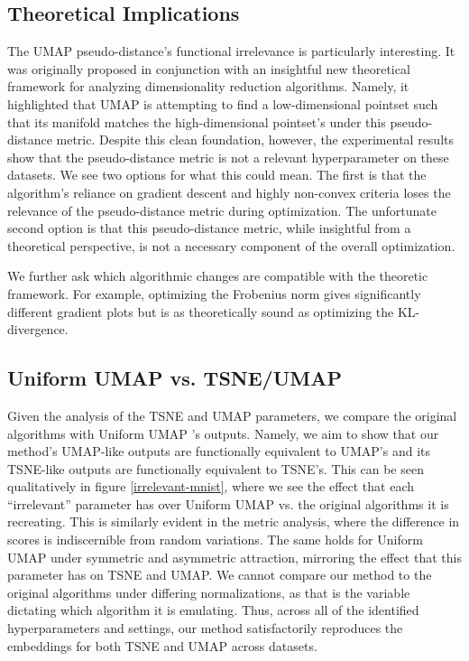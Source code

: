 \documentclass[sigconf, nonacm]{acmart}
\newcommand\ourmethod{Uniform UMAP }
\begin{document}
\subsection{Theoretical Implications}
The UMAP pseudo-distance's functional irrelevance is particularly interesting. It was originally proposed in conjunction with an insightful new theoretical
framework for analyzing dimensionality reduction algorithms. Namely, it highlighted that UMAP is attempting to find a low-dimensional pointset such that its
manifold matches the high-dimensional pointset's under this pseudo-distance metric. Despite this clean foundation, however, the experimental results show that
the pseudo-distance metric is not a relevant hyperparameter on these datasets. We see two options for what this could mean. The first is that the algorithm's
reliance on gradient descent and highly non-convex criteria loses the relevance of the pseudo-distance metric during optimization. The unfortunate second option
is that this pseudo-distance metric, while insightful from a theoretical perspective, is not a necessary component of the overall optimization.

We further ask which algorithmic changes are compatible with the theoretic framework. For example, optimizing the Frobenius norm gives significantly different
gradient plots but is as theoretically sound as optimizing the KL-divergence.

\subsection{\ourmethod vs. TSNE/UMAP}
Given the analysis of the TSNE and UMAP parameters, we compare the original algorithms with \ourmethod's outputs. Namely, we aim to show that our method's
UMAP-like outputs are functionally equivalent to UMAP's and its TSNE-like outputs are functionally equivalent to TSNE's. This can be seen qualitatively in
figure \ref{irrelevant-mnist}, where we see the effect that each ``irrelevant'' parameter has over \ourmethod vs. the original algorithms it is recreating. This
is similarly evident in the metric analysis, where the difference in scores is indiscernible from random variations. The same holds for \ourmethod under
symmetric and asymmetric attraction, mirroring the effect that this parameter has on TSNE and UMAP. We cannot compare our method to the original algorithms
under differing normalizations, as that is the variable dictating which algorithm it is emulating. Thus, across all of the identified hyperparameters and
settings, our method satisfactorily reproduces the embeddings for both TSNE and UMAP across datasets.
\end{document}
